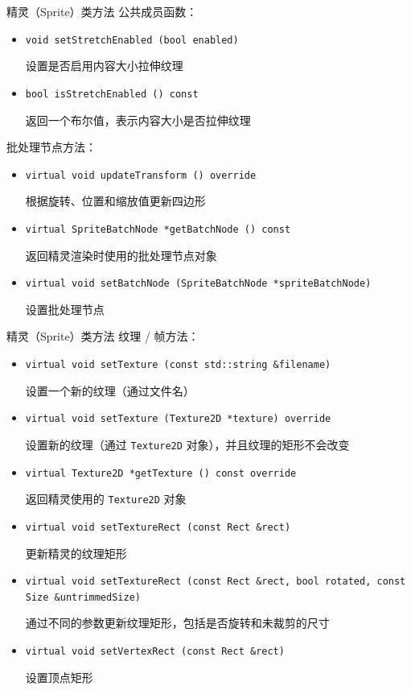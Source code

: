 \documentclass{beamer}
\begin{document}

\begin{frame}[fragile]{精灵（Sprite）类方法}
公共成员函数：
\begin{itemize}
\item \texttt{void setStretchEnabled (bool enabled)}

设置是否启用内容大小拉伸纹理
\item \texttt{bool isStretchEnabled () const}

返回一个布尔值，表示内容大小是否拉伸纹理
\end{itemize}
批处理节点方法：
\begin{itemize}
\item \texttt{virtual void updateTransform () override}

根据旋转、位置和缩放值更新四边形
\item \texttt{virtual SpriteBatchNode *getBatchNode () const}

返回精灵渲染时使用的批处理节点对象
\item \texttt{virtual void setBatchNode (SpriteBatchNode *spriteBatchNode)}

设置批处理节点
\end{itemize}
\end{frame}


\begin{frame}[fragile]{精灵（Sprite）类方法}
纹理 / 帧方法：
\begin{itemize}
\item \texttt{virtual void setTexture (const std::string \&filename)}

设置一个新的纹理（通过文件名）
\item \texttt{virtual void setTexture (Texture2D *texture) override}

设置新的纹理（通过 \texttt{Texture2D} 对象），并且纹理的矩形不会改变
\item \texttt{virtual Texture2D *getTexture () const override}

返回精灵使用的 \texttt{Texture2D} 对象
\item \texttt{virtual void setTextureRect (const Rect \&rect)}

更新精灵的纹理矩形
\item \texttt{virtual void setTextureRect (const Rect \&rect, bool rotated, const Size \&untrimmedSize)}

通过不同的参数更新纹理矩形，包括是否旋转和未裁剪的尺寸
\item \texttt{virtual void setVertexRect (const Rect \&rect)}

设置顶点矩形
\end{itemize}
\end{frame}
\end{document}
